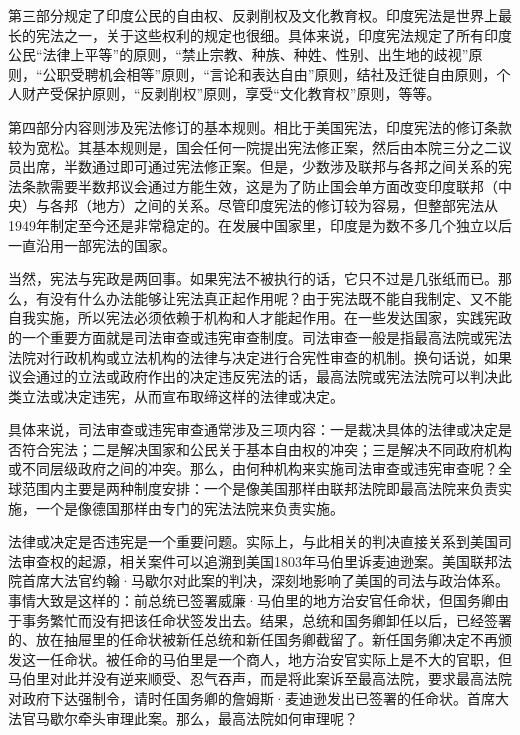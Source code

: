 第三部分规定了印度公民的自由权、反剥削权及文化教育权。印度宪法是世界上最长的宪法之一，关于这些权利的规定也很细。具体来说，印度宪法规定了所有印度公民“法律上平等”的原则，“禁止宗教、种族、种姓、性别、出生地的歧视”原则，“公职受聘机会相等”原则，“言论和表达自由”原则，结社及迁徙自由原则，个人财产受保护原则，“反剥削权”原则，享受“文化教育权”原则，等等。

第四部分内容则涉及宪法修订的基本规则。相比于美国宪法，印度宪法的修订条款较为宽松。其基本规则是，国会任何一院提出宪法修正案，然后由本院三分之二议员出席，半数通过即可通过宪法修正案。但是，少数涉及联邦与各邦之间关系的宪法条款需要半数邦议会通过方能生效，这是为了防止国会单方面改变印度联邦（中央）与各邦（地方）之间的关系。尽管印度宪法的修订较为容易，但整部宪法从1949年制定至今还是非常稳定的。在发展中国家里，印度是为数不多几个独立以后一直沿用一部宪法的国家。


当然，宪法与宪政是两回事。如果宪法不被执行的话，它只不过是几张纸而已。那么，有没有什么办法能够让宪法真正起作用呢？由于宪法既不能自我制定、又不能自我实施，所以宪法必须依赖于机构和人才能起作用。在一些发达国家，实践宪政的一个重要方面就是司法审查或违宪审查制度。司法审查一般是指最高法院或宪法法院对行政机构或立法机构的法律与决定进行合宪性审查的机制。换句话说，如果议会通过的立法或政府作出的决定违反宪法的话，最高法院或宪法法院可以判决此类立法或决定违宪，从而宣布取缔这样的法律或决定。

具体来说，司法审查或违宪审查通常涉及三项内容：一是裁决具体的法律或决定是否符合宪法；二是解决国家和公民关于基本自由权的冲突；三是解决不同政府机构或不同层级政府之间的冲突。那么，由何种机构来实施司法审查或违宪审查呢？全球范围内主要是两种制度安排：一个是像美国那样由联邦法院即最高法院来负责实施，一个是像德国那样由专门的宪法法院来负责实施。

法律或决定是否违宪是一个重要问题。实际上，与此相关的判决直接关系到美国司法审查权的起源，相关案件可以追溯到美国1803年马伯里诉麦迪逊案。美国联邦法院首席大法官约翰·马歇尔对此案的判决，深刻地影响了美国的司法与政治体系。事情大致是这样的：前总统已签署威廉·马伯里的地方治安官任命状，但国务卿由于事务繁忙而没有把该任命状签发出去。结果，总统和国务卿卸任以后，已经签署的、放在抽屉里的任命状被新任总统和新任国务卿截留了。新任国务卿决定不再颁发这一任命状。被任命的马伯里是一个商人，地方治安官实际上是不大的官职，但马伯里对此并没有逆来顺受、忍气吞声，而是将此案诉至最高法院，要求最高法院对政府下达强制令，请时任国务卿的詹姆斯·麦迪逊发出已签署的任命状。首席大法官马歇尔牵头审理此案。那么，最高法院如何审理呢？

